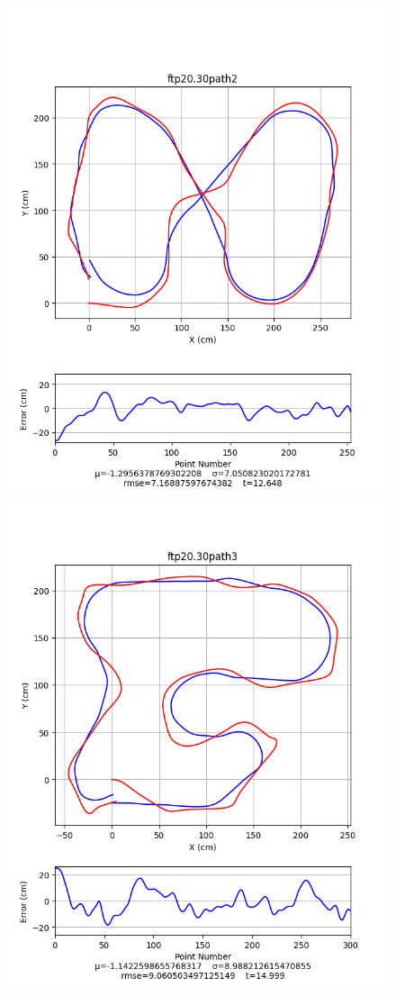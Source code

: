\documentclass[mla8alt]{mla}
\begin{document}
\begin{paper}
\begin{figure}[H]
\includegraphics[width=\linewidth]{pathData/ftppath2}
\endminipage\\
\includegraphics[width=\linewidth]{pathData/ftppath3}

\end{figure}
\end{paper}
\end{document}
